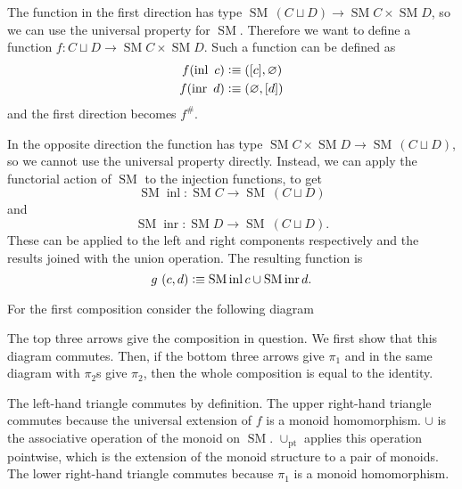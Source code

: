 \documentclass[12pt, parskip, DIV=14]{scrbook}
\newcommand{\defeq}{\vcentcolon\equiv}
\renewcommand{\circ}{\vysmwhtcircle}
\newcommand{\SM}{\operatorname{SM}}
\newcommand{\inl}{\operatorname{inl}}
\newcommand{\inr}{\operatorname{inr}}
\begin{document}
The function in the first direction has type $\SM\,(C \sqcup D) \to \SM C \times \SM D$, so we can use the universal property for $\SM$. Therefore we want to define a function $f : C \sqcup D \to \SM C \times \SM D$. Such a function can be defined as
\begin{align*}
  f (\inl~c) &\defeq ([c] , \varnothing) \\
  f (\inr~d) &\defeq (\varnothing , [d])
\end{align*} and the first direction becomes $f^\#$.

In the opposite direction the function has type $\SM C \times \SM D \to \SM\,(C \sqcup D)$, so we cannot use the universal property directly. Instead, we can apply the functorial action of $\SM$ to the injection functions, to get $$\SM \inl : \SM C \to \SM~(C \sqcup D)$$ and $$\SM \inr : \SM D \to \SM~(C \sqcup D).$$ These can be applied to the left and right components respectively and the results joined with the union operation. The resulting function is
$$g~(c , d) \defeq \SM \inl c \cup \SM \inr d.$$

For the first composition consider the following diagram
\begin{center}
\footnotesize
{}
\end{center}

The top three arrows give the composition in question. We first show that this diagram commutes. Then, if the bottom three arrows give $\pi_1$ and in the same diagram with $\pi_2$s give $\pi_2$, then the whole composition is equal to the identity.

The left-hand triangle commutes by definition. The upper right-hand triangle commutes because the universal extension of $f$ is a monoid homomorphism. $\cup$ is the associative operation of the monoid on $\SM$. $\cup_{\mathrm{pt}}$ applies this operation pointwise, which is the extension of the monoid structure to a pair of monoids. The lower right-hand triangle commutes because $\pi_1$ is a monoid homomorphism.
\end{document}
